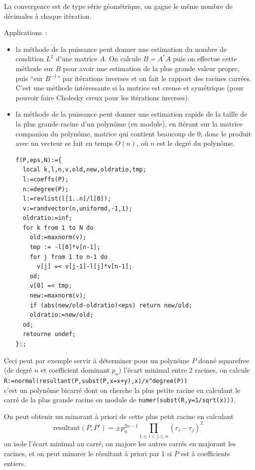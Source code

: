 \documentclass[a4paper,11pt]{book}
\begin{document}
\begin{giacjshere}
La convergence est de type série géométrique, on gagne le même nombre
de décimales à chaque itération. 

Applications~: 
\begin{itemize}
\item la m\'ethode de la puissance peut donner
une estimation du nombre de condition $L^2$ d'une
matrice $A$. On calcule $B=A^* A$ puis on effectue
cette m\'ethode sur $B$ pour avoir une estimation
de la plus grande valeur propre, puis ``sur $B^{-1}$''
par it\'erations inverses et on fait le rapport des racines carr\'ees.
C'est une m\'ethode int\'eressante si la matrice
est creuse et sym\'etrique (pour pouvoir faire Cholesky creux
pour les it\'erations inverses).
\item
la m\'ethode de la puissance peut donner une estimation
rapide de la taille de la plus grande racine d'un polyn\^ome (en
module), en it\'erant sur la matrice companion du polyn\^ome,
matrice qui contient beaucoup de 0, donc le produit avec un vecteur
se fait en temps $O(n)$, o\`u $n$ est le degr\'e du polyn\^ome.
\begin{verbatim}
f(P,eps,N):={
  local k,l,n,v,old,new,oldratio,tmp;
  l:=coeffs(P);
  n:=degree(P);
  l:=revlist(l[1..n]/l[0]);
  v:=randvector(n,uniformd,-1,1);
  oldratio:=inf;
  for k from 1 to N do
    old:=maxnorm(v);
    tmp := -l[0]*v[n-1];
    for j from 1 to n-1 do
      v[j] =< v[j-1]-l[j]*v[n-1];
    od;
    v[0] =< tmp;
    new:=maxnorm(v);
    if (abs(new/old-oldratio)<eps) return new/old;
    oldratio:=new/old;
  od;
  retourne undef;
}:;
\end{verbatim}
\end{itemize}

Ceci peut par exemple servir à déterminer pour un polynôme $P$ donné
squarefree (de degr\'e $n$ et coefficient dominant $p_n$)
l'écart minimal entre 2 racines, on calcule\\
\verb|R:=normal(resultant(P,subst(P,x=x+y),x)/x^degree(P))|\\
c'est un polynôme bicarré dont on cherche la plus petite racine
en calculant le carré de la plus grande racine en module
de \verb|numer(subst(R,y=1/sqrt(x)))|.

On peut obtenir un minorant à priori de cette plus petit racine en calculant 
\[ 
\mbox{resultant}(P,P')= 
\pm p_n^{2n-1} \prod_{1 \leq i < j \leq n} (r_i-r_j)^2 
\]
on isole l'écart minimal au carré, on majore les autres carr\'es en
majorant les racines, et
on peut minorer le résultant à priori par 1 si $P$ est à coefficients
entiers.


\end{giacjshere}
\end{document}
